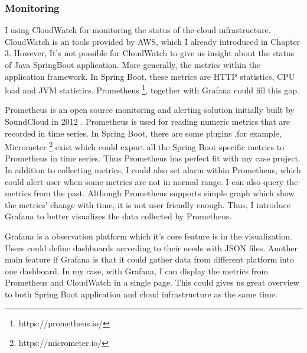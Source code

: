 \subsubsection{Monitoring}
I using CloudWatch for monitoring the status of the cloud infrastructure. CloudWatch is an tools provided by AWS, which I already introduced in Chapter 3. However, It's not possible for CloudWatch to give us insight about the status of Java SpringBoot application. More generally, the metrics within the application framework. In Spring Boot, these metrics are HTTP statistics, CPU load and JVM statistics. Prometheus \footnote{https://prometheus.io/}, together with Grafana could fill this gap.
\par
Prometheus is an open source monitoring and alerting solution initially built by SoundCloud in 2012 \cite{Overview30:online}. Prometheus is used for reading numeric metrics that are recorded in time series. In Spring Boot, there are some plugins ,for example, Micrometer \footnote{https://micrometer.io/} exist which could export all the Spring Boot specific metrics to Prometheus in time series. Thus Prometheus has perfect fit with my case project. In addition to collecting metrics, I could also set alarm within Prometheus, which could alert user when some metrics are not in normal range. I can also query the metrics from the past. Although Prometheus supports simple graph which show the metrics' change with time, it is not user friendly enough. Thus, I introduce Grafana to better visualizes the data collected by Prometheus.
\par
Grafana is a observation platform which it's core feature is in the visualization. Users could define dashboards according to their needs with JSON files. Another main feature if Grafana is that it could gather data from different platform into one dashboard. In my case, with Grafana, I can display the metrics from Prometheus and CloudWatch in a single page. This could gives us great overview to both Spring Boot application and cloud infrastructure as the same time.

